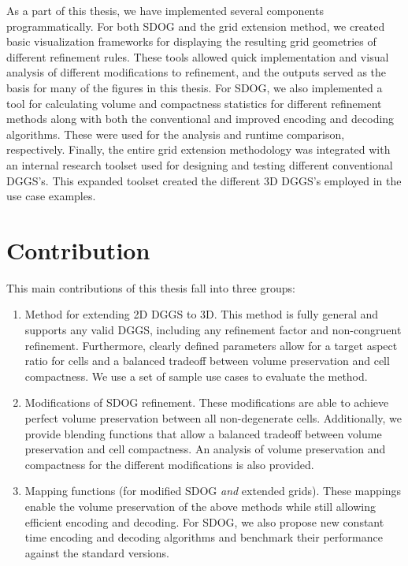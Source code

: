 As a part of this thesis, we have implemented several components programmatically.
For both SDOG and the grid extension method, we created basic visualization frameworks for displaying the resulting grid geometries of different refinement rules.
These tools allowed quick implementation and visual analysis of different modifications to refinement, and the outputs served as the basis for many of the figures in this thesis.
For SDOG, we also implemented a tool for calculating volume and compactness statistics for different refinement methods along with both the conventional and improved encoding and decoding algorithms.
These were used for the analysis and runtime comparison, respectively.
Finally, the entire grid extension methodology was integrated with an internal research toolset used for designing and testing different conventional DGGS's.
This expanded toolset created the different 3D DGGS's employed in the use case examples.


\section{Contribution} \label{chap:1:contribution}
This main contributions of this thesis fall into three groups:

\begin{enumerate}
	\item Method for extending 2D DGGS to 3D.
	This method is fully general and supports any valid DGGS, including any refinement factor and non-congruent refinement.
	Furthermore, clearly defined parameters allow for a target aspect ratio for cells and a balanced tradeoff between volume preservation and cell compactness.
	We use a set of sample use cases to evaluate the method.

	\item Modifications of SDOG refinement.
	These modifications are able to achieve perfect volume preservation between all non-degenerate cells.
	Additionally, we provide blending functions that allow a balanced tradeoff between volume preservation and cell compactness.
	An analysis of volume preservation and compactness for the different modifications is also provided.

	\item Mapping functions (for modified SDOG \textit{and} extended grids).
	These mappings enable the volume preservation of the above methods while still allowing efficient encoding and decoding.
	For SDOG, we also propose new constant time encoding and decoding algorithms and benchmark their performance against the standard versions.
\end{enumerate}

